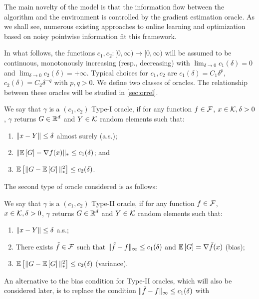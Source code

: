 The main novelty of the model is that the information flow between the algorithm and the environment is controlled by the gradient estimation oracle. As we shall see, numerous existing approaches to online learning and optimization based on noisy pointwise information fit this framework. 

In what follows, the functions $c_1,c_2:[0,\infty)\to [0,\infty)$ will be assumed to be continuous, 
monotonously increasing (resp., decreasing) with 
$\lim_{\delta\to  0} c_1(\delta)=0$ and $\lim_{\delta\to 0} c_2(\delta)=+\infty$.
Typical choices for $c_1,c_2$ are $c_1(\delta) = C_1 \delta^p$, $c_2(\delta) = C_2\delta^{-q}$ with $p,q>0$.
We define two classes of oracles. The relationship between these oracles will be studied in \cref{sec:orrel}.
\begin{definition}
We say that $\gamma$ is a  $(c_1,c_2)$ Type-I oracle, if for any function $f\in \mathcal{F}$,
$x\in \mathcal{K},\delta>0$, $\gamma$ returns $G\in \mathbb{R}^d$ and  $Y\in \mathcal{K}$ random elements such that:
\begin{enumerate}
\item $\|x-Y\|\le \delta$ almost surely (a.s.);
\item $\| \mathbb{E}\left[G\right]  - \nabla f(x)  \|_* \le c_1(\delta) $; and
\item $\mathbb{E}\left[\| G -  \mathbb{E}\left[G\right] \|_*^2\right] \le c_2(\delta)$.
\end{enumerate}
\end{definition}
The second type of oracle considered is as follows:
\begin{definition}
We say that $\gamma$ is a  $(c_1,c_2)$ Type-II oracle, if for any function $f\in \mathcal{F}$,
$x\in \mathcal{K},\delta>0$, $\gamma$ returns $G\in \mathbb{R}^d$ and  $Y\in \mathcal{K}$ random elements such that:
\begin{enumerate}
\item $\|x-Y\|\le \delta$ a.s.;
\item There exists $\tilde{f} \in \mathcal{F}$ such that  
$\|\tilde{f}- f\|_\infty \le c_1(\delta)$  and
$\mathbb{E}\left[G\right]  = \nabla \tilde{f}(x)$ (bias);
\item $\mathbb{E}\left[\| G -  \mathbb{E}\left[G\right] \|_*^2\right] \le c_2(\delta)$ (variance).
\end{enumerate}
\end{definition}
An alternative to the bias condition for Type-II oracles, which will also be considered later, is to replace the condition $\|\tilde{f}-f\|_\infty \le c_1(\delta)$ with 
